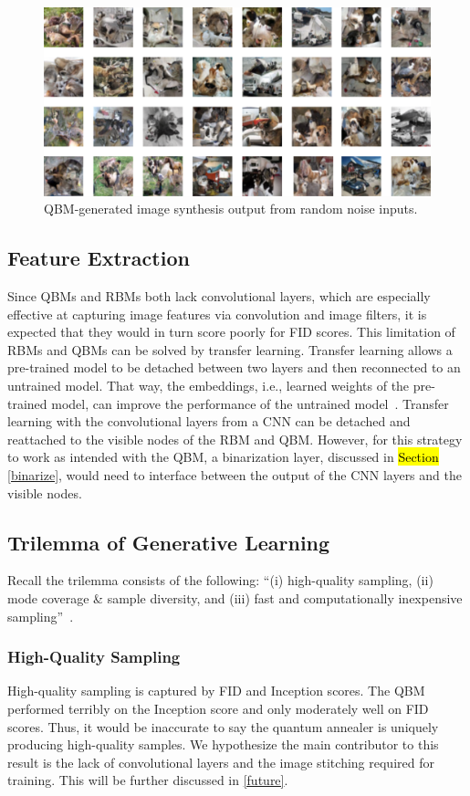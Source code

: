 \documentclass[technologies,article,accept,pdftex,moreauthors]{Definitions/mdpi}
\begin{document}
\begin{figure}[H]
    \includegraphics[width=.99\columnwidth]{qbmout.png}
    \caption{\label{fig:qbmresults}QBM-generated image synthesis output from random noise inputs.}
\end{figure}

\subsection{Feature Extraction}
Since QBMs and RBMs both lack convolutional layers, which are especially effective at capturing image features via convolution and image filters, it is expected that they would in turn score poorly for FID scores. This limitation of RBMs and QBMs can be solved by transfer learning. Transfer learning allows a pre-trained model to be detached between two layers and then reconnected to an untrained model. That way, the embeddings, i.e., learned weights of the pre-trained model, can improve the performance of the untrained model~\cite{transfer}. Transfer learning with the convolutional layers from a CNN can be detached and reattached to the visible nodes of the RBM and QBM. However, for this strategy to work as intended with the QBM, a binarization layer, discussed in \hl{Section} \ref{binarize},  would need to interface between the output of the CNN layers and the visible nodes. %


\subsection{Trilemma of Generative Learning}
Recall the trilemma consists of the following: ``(i) high-quality sampling, (ii) mode coverage \& sample diversity, and (iii) fast and computationally inexpensive sampling''~\cite{xiao2022DDGAN}.

\subsubsection{High-Quality Sampling}
High-quality sampling is captured by FID and Inception scores. The QBM performed terribly on the Inception score and only moderately well on FID scores. Thus, it would be inaccurate to say the quantum annealer is uniquely producing high-quality samples. We hypothesize the main contributor to this result is the lack of convolutional layers and the image stitching required for training. This will be further discussed in \ref{future}.
\end{document}
